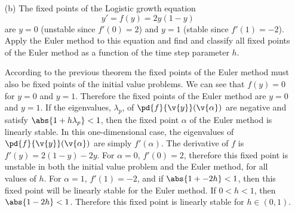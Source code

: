 \documentclass[11pt]{article}
\begin{document}
\begin{enumerate}
\begin{enumerate}
\begin{proof}
                    To prove the second point, 
                \end{proof}

            \item[(b)] %
                The fixed points of the Logistic growth equation
                \[
                    y' = f(y) = 2y(1 - y)
                \]
                are $y = 0$ (unstable since $f'(0) = 2$) and $y = 1$ (stable
                since $f'(1) = -2$).
                Apply the Euler method to this equation and find and classify all
                fixed points of the Euler method as a function of the time step
                parameter $h$.

                According to the previous theorem the fixed points of the Euler
                method must also be fixed points of the initial value problems.
                We can see that $f(y) = 0$ for $y = 0$ and $y = 1$.
                Therefore the fixed points of the Euler method are $y = 0$ and
                $y = 1$.
                If the eigenvalues, $\lambda_p$, of $\pd{f}{\v{y}}(\v{\alpha})$ are negative and
                satisfy $\abs{1 + h\lambda_p} < 1$, then the fixed point
                $\alpha$ of the Euler method is linearly stable.
                In this one-dimensional case, the eigenvalues of
                $\pd{f}{\v{y}}(\v{\alpha})$ are simply $f'(\alpha)$.
                The derivative of $f$ is $f'(y) = 2(1-y) - 2y$.
                For $\alpha = 0$, $f'(0) = 2$, therefore this fixed point is
                unstable in both the initial value problem and the Euler method,
                for all values of $h$.
                For $\alpha = 1$, $f'(1) = -2$, and if $\abs{1 + -2h} < 1$, then
                this fixed point will be linearly stable for the Euler method.
                If $0 < h < 1$, then $\abs{1 - 2h} < 1$.
                Therefore this fixed point is linearly stable for $h \in (0, 1)$.
        \end{enumerate}
\end{enumerate}
\end{document}
